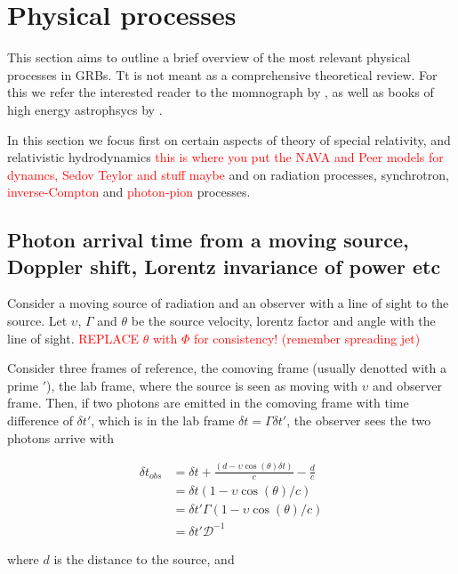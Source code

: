 \documentclass[11pt,a4paper,headinclude=true,DIV=14,BCOR=8mm,chapterprefix,listof=totoc,twoside,openright,abstracton]{scrbook}
\newcommand{\red}[1]{\textcolor{red}{#1}}
\begin{document}

\section{Physical processes}

This section aims to outline a brief overview of the most relevant physical processes in GRBs. Tt is not meant as a comprehensive theoretical review. For this we refer the interested reader to the momnograph by \cite{Rybicki and Lightman (1979)}, as well as books of high energy astrophsycs by \cite{Longair (2010); Krolik (1999); Dermer and Menon (2009); Kulsrud (2005)}.

In this section we focus first on certain aspects of theory of special relativity, and relativistic hydrodynamics \red{this is where you put the NAVA and Peer models for dynamcs, Sedov Teylor and stuff maybe} 
and on radiation processes, synchrotron, \red{inverse-Compton} and \red{photon-pion} processes.

\subsection{Photon arrival time from a moving source, Doppler shift, Lorentz invariance of power etc}

Consider a moving source of radiation and an observer with a line of sight to the source. Let $\upsilon$, $\Gamma$ and $\theta$ be the source velocity, lorentz factor and angle with the line of sight. \red{REPLACE $\theta$ with $\Phi$ for consistency! (remember spreading jet)}

Consider three frames of reference, the comoving frame (usually denotted with a prime $'$), the lab frame, where the source is seen as moving with $\upsilon$ and observer frame. Then, if two photons are emitted in the comoving frame with time difference of $\delta t'$, which is in the lab frame $\delta t = \Gamma \delta t'$, the observer sees the two photons arrive with 

\begin{eqnarray}
   \delta t_{obs} &= \delta t + \frac{(d - \upsilon\cos(\theta) \delta t)}{c} - \frac{d}{c} \\
   &= \delta t (1 - \upsilon \cos(\theta) / c) \\
   &= \delta t' \Gamma (1 - \upsilon \cos(\theta) / c)\\
   &= \delta t' \mathcal{D}^{-1}
\end{eqnarray}

where $d$ is the distance to the source, and 
\end{document}
